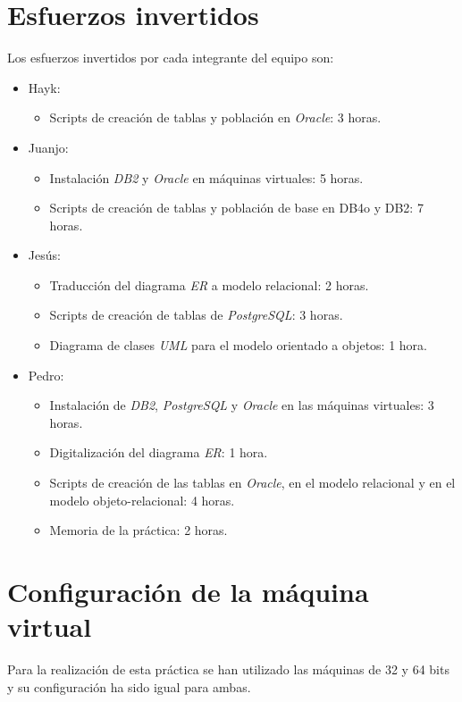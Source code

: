 \documentclass{article}
\begin{document}
\section{Esfuerzos invertidos}
Los esfuerzos invertidos por cada integrante del equipo son:
\begin{itemize}
\item Hayk:
\begin{itemize}
\item Scripts de creación de tablas y población en \emph{Oracle}: 3 horas.
\end{itemize}

\item Juanjo:
\begin{itemize}
\item Instalación \emph{DB2} y \emph{Oracle} en máquinas virtuales: 5 horas.
\item Scripts de creación de tablas y población de base en DB4o y DB2: 7 horas.
\end{itemize}	

\item Jesús:
\begin{itemize}
\item Traducción del diagrama \emph{ER} a modelo relacional: 2 horas.
\item Scripts de creación de tablas de \emph{PostgreSQL}: 3 horas.
\item Diagrama de clases \emph{UML} para el modelo orientado a objetos: 1 hora.
\end{itemize}

\item Pedro: 
\begin{itemize}
\item Instalación de \emph{DB2}, \emph{PostgreSQL} y \emph{Oracle} en las máquinas virtuales: 3 horas.
\item Digitalización del diagrama \emph{ER}: 1 hora.
\item Scripts de creación de las tablas en \emph{Oracle}, en el modelo relacional y en el modelo objeto-relacional: 4 horas.
\item Memoria de la práctica: 2 horas.
\end{itemize}

\end{itemize}

\section{Configuración de la máquina virtual}
Para la realización de esta práctica se han utilizado las máquinas de 32 y 64 bits y su configuración ha sido igual para ambas.\\
\end{document}
